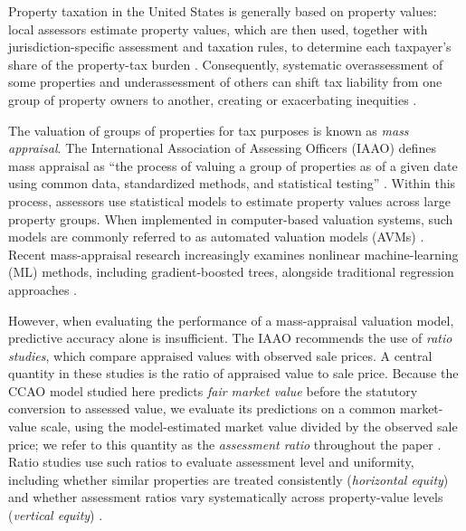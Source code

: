 \documentclass[10pt]{article}
\theoremstyle{definition}
\newcommand{\1}{\mathbf{1}}
\begin{document}
{Property taxation in the United States is generally based on property values}: local assessors estimate property values, which are then used, together with jurisdiction-specific assessment and taxation rules, to determine each taxpayer's share of the property-tax burden \cite{IAAO2020PropertyTaxPolicy,IAAO2025Mass}. Consequently, systematic overassessment of some properties and underassessment of others can shift tax liability from one group of property owners to another, creating or exacerbating inequities \cite{Berry2021,IAAO2020PropertyTaxPolicy}.

The {valuation} of groups of properties for tax purposes is known as \emph{mass appraisal}. The International Association of Assessing Officers (IAAO) defines mass appraisal as ``the process of valuing a group of properties as of a given date using common data, standardized methods, and statistical testing'' \cite{IAAO2025Mass}. Within this process, assessors use statistical models to estimate property values across large property groups. {When implemented in computer-based valuation systems, such models are commonly referred to as automated valuation models (AVMs)} \cite{IAAOAITaskForce2022,BidansetRakow2022}. Recent mass-appraisal research increasingly examines nonlinear machine-learning (ML) methods, including gradient-boosted trees, alongside traditional regression approaches \cite{Rootetal2023,Sevgen2024100111,Zilli2024}. %

However, when evaluating the performance of a mass-appraisal valuation model, predictive accuracy alone is insufficient. The IAAO recommends the use of \emph{ratio studies}, which compare {appraised values} with observed sale prices. 
{A central quantity in these studies is the ratio of appraised value to sale price. Because the CCAO model studied here predicts \emph{fair market value} before the statutory conversion to assessed value, we evaluate its predictions on a common market-value scale, using the model-estimated market value divided by the observed sale price; we refer to this quantity as the \emph{assessment ratio} throughout the paper \cite{CCAOModelResAVM2026}.} Ratio studies use such ratios to evaluate assessment level and uniformity, including whether similar properties are treated consistently (\emph{horizontal equity}) and whether assessment ratios vary systematically across property-value levels (\emph{vertical equity}) \cite{IAAO2013Ratio,IAAO2025Mass}.
\end{document}
